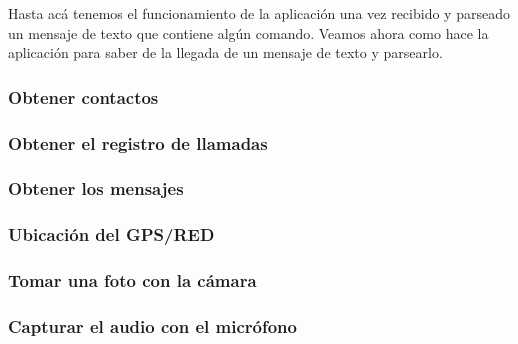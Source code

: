 Hasta acá tenemos el funcionamiento de la aplicación una vez recibido y parseado un mensaje de texto que contiene algún comando.
Veamos ahora como hace la aplicación para saber de la llegada de un mensaje de texto y parsearlo.


\subsubsection{Obtener contactos}
\subsubsection{Obtener el registro de llamadas}
\subsubsection{Obtener los mensajes}

\subsubsection{Ubicación del GPS/RED}
%
%
%
    

\subsubsection{Tomar una foto con la cámara}
\subsubsection{Capturar el audio con el micrófono}
